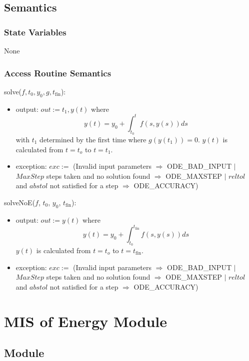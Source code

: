 \documentclass[12pt]{article}
\begin{document}
\subsection{Semantics}

\subsubsection{State Variables}

None

\subsubsection{Access Routine Semantics}

solve($f, t_0, y_0, g, t_\text{fin}$): 
\begin{itemize}
\item output: $out := t_1, y(t)$ where 
$$y(t) = y_0 + \int_{t_0}^{t} f(s, y(s)) ds$$ 
with $t_1$ determined by the first time where $g(y(t_1)) = 0$.  $y(t)$ is
calculated from $t = t_o$ to $t = t_1$.
\item exception: $exc :=$ (Invalid input parameters $\Rightarrow$
  ODE\_BAD\_INPUT $|$ $MaxStep$ steps taken and no solution found $\Rightarrow$
  ODE\_MAXSTEP $|$ $reltol$ and $abstol$ not satisfied for a step $\Rightarrow$
  ODE\_ACCURACY)
\end{itemize}

solveNoE($f$, $t_0$, $y_0$, $t_\text{fin}$): 
\begin{itemize}
\item output: $out := y(t)$ where 
$$y(t) = y_0 + \int_{t_0}^{t_\text{fin}} f(s, y(s)) ds$$ 
$y(t)$ is calculated from $t = t_o$ to $t = t_\text{fin}$.
\item exception: $exc :=$ (Invalid input parameters $\Rightarrow$
  ODE\_BAD\_INPUT $|$ $MaxStep$ steps taken and no solution found $\Rightarrow$
  ODE\_MAXSTEP $|$ $reltol$ and $abstol$ not satisfied for a step $\Rightarrow$
  ODE\_ACCURACY)
\end{itemize}

\newpage
\section{MIS of Energy Module} \label{Energy}

\subsection{Module}
\end{document}

